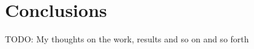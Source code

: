 \chapter{Conclusions}\label{cha:conclusions}

TODO: My thoughts on the work, results and so on and so forth 
